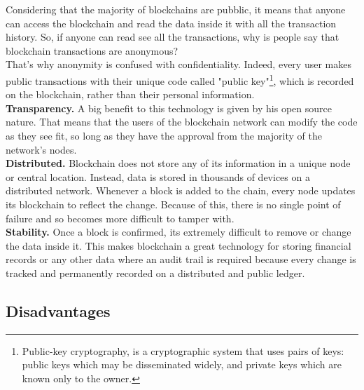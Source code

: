 Considering that the majority of blockchains are pubblic, it means that anyone 
can access the blockchain and read the data inside it with all the transaction 
history. So, if anyone can read see all the transactions, why is people say that
blockchain transactions are anonymous?\\
That’s why anonymity is confused with confidentiality. Indeed, every user makes 
public transactions with their unique code called "public key"\footnote{Public-key cryptography, is a cryptographic system that uses pairs of keys: public keys which may be disseminated widely, and private keys which are known only to the owner.},
which is recorded on the blockchain, rather than their personal information.\cite{investopedia}
\bigskip\\
\textbf{Transparency.}
A big benefit to this technology is given by his open source nature. That means
that the users of the blockchain network can modify the code as they see fit, so long
as they have the approval from the majority of the network's nodes.
\bigskip\\
\textbf{Distributed.}
Blockchain does not store any of its information in a unique node or central 
location. Instead, data is stored in thousands of devices on a distributed
network. Whenever a block is added to the chain, every node updates its blockchain
to reflect the change. Because of this, there is no single point of failure
and so becomes more difficult to tamper with.\cite{binancevision}\cite{investopedia}
\bigskip\\
\textbf{Stability.}
Once a block is confirmed, its extremely difficult to remove or change the data inside it.
This makes blockchain a great technology for storing financial records or any other data 
where an audit trail is required because every change is tracked and permanently recorded 
on a distributed and public ledger.\cite{binancevision}
\bigskip

\subsection{Disadvantages}
\label{sec:disadvantages}

